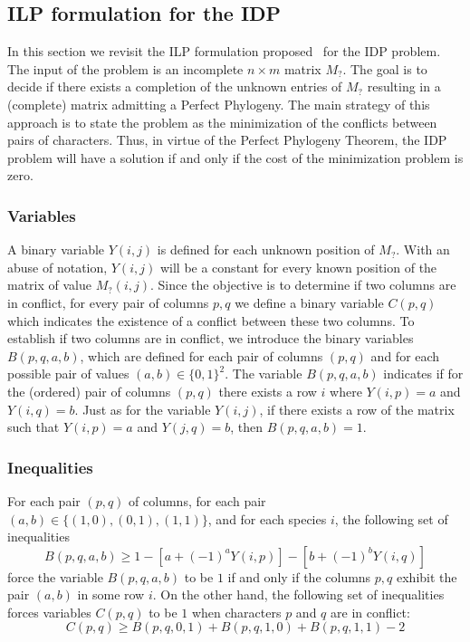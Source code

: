 \documentclass[a4paper,USenglish]{article}
\theoremstyle{definition}
\begin{document}
\subsection{ILP formulation for the IDP}
\label{sec:ilp}
 In this section we revisit the ILP formulation proposed~\cite{Gusfield2007} for the IDP problem.
%
The input of the problem is an incomplete $n\times m$ matrix $M_?$.
The goal is to decide if there exists a completion of the unknown
entries  of $M_?$ resulting in
a (complete) matrix  admitting a Perfect Phylogeny.
The main  strategy of  this approach  is to state  the problem  as the
  minimization of the conflicts between pairs of characters. 
Thus, in virtue of the  Perfect Phylogeny Theorem, the IDP problem
will have a solution if and only if the cost of the minimization problem
is zero.  


\subsubsection{Variables}
  \label{sec:ILP_variables}  
A binary variable $Y(i,j)$ is defined for each unknown position of $M_?$.
With an abuse of notation, $Y(i,j)$ will be  a constant for every known
  position of the matrix of value  $M_?(i,j)$.  
Since the objective is to determine if two columns are in conflict,
  for every pair of columns $p,q$ we define a  binary variable $C(p,q)$
  which indicates the existence of a conflict between these two columns.
To establish if two columns are in conflict, we introduce the binary variables 
   $B(p,q,a,b)$, which  are defined for each pair of columns $(p,q)$ and for each
   possible  pair  of  values  $(a,b)\in \{0,1\}^2$.
The variable $B(p,q,a,b)$ indicates if for the (ordered) pair of columns $(p,q)$
  there  exists a row $i$ where $Y(i,p)=a$ and $Y(i,q)=b$.
Just as for the variable $Y(i,j)$, if there exists a row of the matrix such that 
  $Y(i,p)=a$ and $Y(j,q)=b$, then $B(p,q,a,b)=1$.

\subsubsection{Inequalities}
\label{sec:ILP_ineq}
For each pair $(p,q)$ of columns, for each pair $(a,b)\in
\{(1,0),(0,1),(1,1)\} $, and for each species $i$, the following set of inequalities 
\begin{equation}\label{eq:B}
   B(p,q,a,b)\ge 1-[a+(-1)^{a} Y(i,p)]-[b+(-1)^{b}
  Y(i,q)]
  \end{equation}
  force the variable $B(p,q,a,b)$ to be $1$ if and only if the columns $p,q$
  exhibit the pair $(a,b)$ in some row $i$.
  On the other hand, the following set of inequalities
 forces  variables  $C(p,q)$ to  be  $1$  when characters  $p$  and  $q$ are  in
 conflict:  
\begin{equation}\label{eq:C} 
  C(p, q) \ge B(p,q,0,1) + B(p,q,1,0) + B(p,q,1,1)- 2  
\end{equation}
\end{document}
